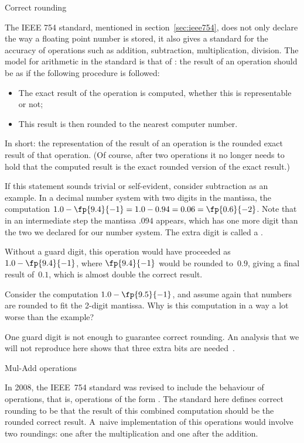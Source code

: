  {Correct rounding}

The IEEE 754 standard, mentioned in section~\ref{sec:ieee754}, does
not only declare the way a floating point number is stored, it also
gives a standard for the accuracy of operations such as addition,
subtraction, multiplication, division. The model for arithmetic in the
standard is that of : the result of an
operation should be as if the following procedure is followed:
\begin{itemize}
\item The exact result of the operation is computed, whether this is
  representable or not;
\item This result is then rounded to the nearest computer number.
\end{itemize}
In short: the representation of the result of an
operation is the rounded exact result of that operation. (Of course,
after two operations it no longer needs to hold that the computed
result is the exact rounded version of the exact result.)

If this statement sounds trivial or self-evident, consider subtraction
as an example. In a decimal number system with two digits in the
mantissa, the computation
$1.0-\fp{9.4}{-1}=1.0-0.94=0.06=\fp{0.6}{-2}$. Note that in an
intermediate step the mantissa $.094$ appears, which has one more
digit than the two we declared for our number system. The extra digit
is called a .

Without a guard digit, this operation would have proceeded as
$1.0-\fp{9.4}{-1}$, where $\fp{9.4}{-1}$ would be rounded to~$0.9$,
giving a final result of~$0.1$, which is almost double the correct result.
\begin{exercise}
  Consider the computation $1.0-\fp{9.5}{-1}$, and assume again that
  numbers are rounded to fit the 2-digit mantissa. Why is this
  computation in a way a lot worse than the example?
\end{exercise}
One guard digit is not enough to guarantee correct rounding. An
analysis that we will not reproduce here shows that three extra bits
are needed~\cite{Goldberg:arithmetic}.

 {Mul-Add operations}

In 2008, the IEEE~754 standard was revised to include the behaviour
of  operations, that is, operations of the
form .  The standard here defines correct rounding to be that
the result of this combined computation should be the rounded correct
result. A~naive implementation of this operations would involve two
roundings: one after the multiplication and one after the addition.

